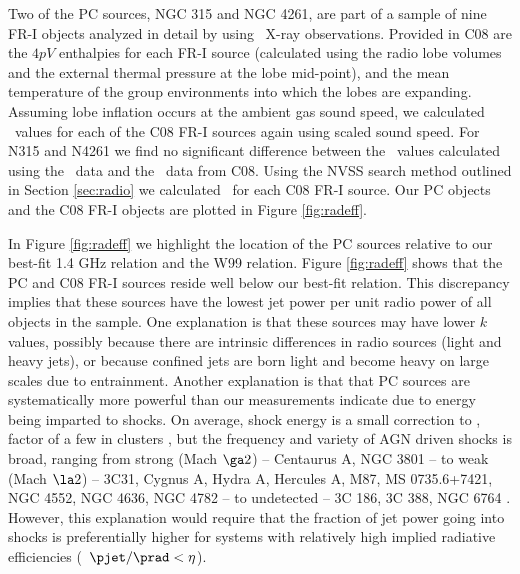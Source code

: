 \documentclass{emulateapj}
\begin{document}
Two of the PC sources, NGC 315 and NGC 4261, are part of a sample of
nine FR-I objects analyzed in detail by \citet[][hereafter
  C08]{2008MNRAS.386.1709C} using \xmm\ X-ray observations. Provided
in C08 are the $4pV$ enthalpies for each FR-I source (calculated using
the radio lobe volumes and the external thermal pressure at the lobe
mid-point), and the mean temperature of the group environments into
which the lobes are expanding. Assuming lobe inflation occurs at the
ambient gas sound speed, we calculated \pcav\ values for each of the
C08 FR-I sources again using scaled sound speed. For N315 and N4261 we
find no significant difference between the \pcav\ values calculated
using the \chandra\ data and the \xmm\ data from C08. Using the NVSS
search method outlined in Section \ref{sec:radio} we calculated
\phigh\ for each C08 FR-I source. Our PC objects and the C08 FR-I
objects are plotted in Figure \ref{fig:radeff}.

In Figure \ref{fig:radeff} we highlight the location of the PC sources
relative to our best-fit 1.4 GHz relation and the W99 relation. Figure
\ref{fig:radeff} shows that the PC and C08 FR-I sources reside well
below our best-fit relation. This discrepancy implies that these
sources have the lowest jet power per unit radio power of all objects
in the sample. One explanation is that these sources may have lower
$k$ values, possibly because there are intrinsic differences in radio
sources (light and heavy jets), or because confined jets are born
light and become heavy on large scales due to entrainment. Another
explanation is that that PC sources are systematically more powerful
than our measurements indicate due to energy being imparted to
shocks. On average, shock energy is a small correction to \pcav,
factor of a few in clusters \citep{mcnamrev}, but the frequency and
variety of AGN driven shocks is broad, ranging from strong (Mach $\ga
2$) -- Centaurus A, NGC 3801 \citep{2003ApJ...592..129K,
  2009MNRAS.395.1999C, 2007ApJ...660..191C} -- to weak (Mach $\la 2$)
-- 3C31, Cygnus A, Hydra A, Hercules A, M87, MS 0735.6+7421, NGC 4552,
NGC 4636, NGC 4782 \citep{2002MNRAS.336.1161L, 2006ApJ...644L...9W,
  hydraa, herca, 2007ApJ...665.1057F, ms0735, 2006ApJ...648..947M,
  2009ApJ...707.1034B, 2007ApJ...664..804M} -- to undetected -- 3C
186, 3C 388, NGC 6764 \citep{2008ApJ...684..811S, 2006ApJ...639..753K,
  2008ApJ...688..190C}. However, this explanation would require that
the fraction of jet power going into shocks is preferentially higher
for systems with relatively high implied radiative efficiencies
(\ie\ $\pjet/\prad < \eta$).
\end{document}
